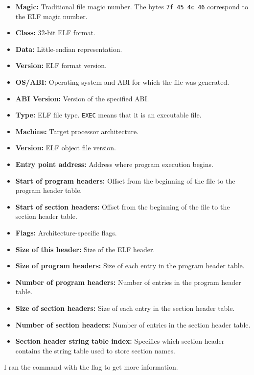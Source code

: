 \begin{itemize}
    \item \textbf{Magic:} Traditional file magic number. The bytes \texttt{7f 45 4c 46} correspond to the ELF magic number.
    \item \textbf{Class:} 32-bit ELF format.
    \item \textbf{Data:} Little-endian representation.
    \item \textbf{Version:} ELF format version.
    \item \textbf{OS/ABI:} Operating system and ABI for which the file was generated.
    \item \textbf{ABI Version:} Version of the specified ABI.
    \item \textbf{Type:} ELF file type. \texttt{EXEC} means that it is an executable file.
    \item \textbf{Machine:} Target processor architecture.
    \item \textbf{Version:} ELF object file version.
    \item \textbf{Entry point address:} Address where program execution begins.
    \item \textbf{Start of program headers:} Offset from the beginning of the file to the program header table.
    \item \textbf{Start of section headers:} Offset from the beginning of the file to the section header table.
    \item \textbf{Flags:} Architecture-specific flags.
    \item \textbf{Size of this header:} Size of the ELF header.
    \item \textbf{Size of program headers:} Size of each entry in the program header table.
    \item \textbf{Number of program headers:} Number of entries in the program header table.
    \item \textbf{Size of section headers:} Size of each entry in the section header table.
    \item \textbf{Number of section headers:} Number of entries in the section header table.
    \item \textbf{Section header string table index:} Specifies which section header contains the string table used to store section names.
\end{itemize}

I ran the command  with the flag  to get more information.

